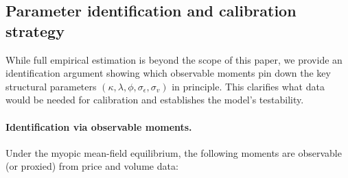 \begin{table}[t]
  \centering
  \scriptsize
  \setlength{\tabcolsep}{3pt}
  \resizebox{\columnwidth}{!}{}
  \caption{Particle convergence check in $N$ (Bull $k=1$; mean $\pm$ 95\% CI across paired seeds; reported as differences relative to the largest $N$).}
  \label{tab:convergence}
\end{table}

\begin{table}[t]
  \centering
  \scriptsize
  \setlength{\tabcolsep}{3pt}
  \resizebox{\columnwidth}{!}{}
  \caption{Sensitivity of the $k$-effect to impact strength $\lambda$ (Bull regime; $\Delta$ denotes $k=3$ minus $k=1$; mean $\pm$ 95\% CI across paired seeds).}
  \label{tab:sensitivity}
\end{table}

\begin{table}[t]
  \centering
  \scriptsize
  \setlength{\tabcolsep}{3pt}
  \resizebox{\columnwidth}{!}{}
  \caption{Robustness to incorporating a noisy price observation in filtering (Bull regime; $\Delta$ denotes $k=3$ minus $k=1$; mean $\pm$ 95\% CI across paired seeds).}
  \label{tab:price_filter}
\end{table}

\begin{table}[t]
  \centering
  \scriptsize
  \setlength{\tabcolsep}{3pt}
  \resizebox{\columnwidth}{!}{}
  \caption{Time-step sensitivity (Bull regime; $\Delta$ denotes $k=3$ minus $k=1$; mean $\pm$ 95\% CI across paired seeds).}
  \label{tab:dt_sensitivity}
\end{table}

\subsection{Parameter identification and calibration strategy}
\label{sec:param_identification}

While full empirical estimation is beyond the scope of this paper, we provide an identification argument showing which observable moments pin down the key structural parameters $(\kappa,\lambda,\phi,\sigma_\epsilon,\sigma_v)$ in principle. This clarifies what data would be needed for calibration and establishes the model's testability.

\paragraph{Identification via observable moments.}
Under the myopic mean-field equilibrium, the following moments are observable (or proxied) from price and volume data:

